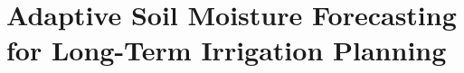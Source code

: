 
\chapter{Adaptive Soil Moisture Forecasting for Long-Term Irrigation Planning}
\label{physics-aware-chap:forecasting}